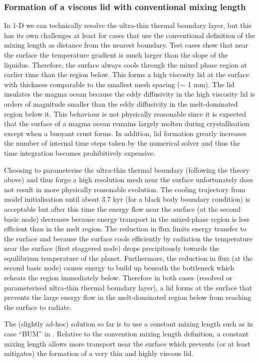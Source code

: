 \subsubsection{Formation of a viscous lid with conventional mixing length}
In 1-D we can technically resolve the ultra-thin thermal boundary layer, but this has its own challenges at least for cases that use the conventional definition of the mixing length as distance from the nearest boundary.  Test cases show that near the surface the temperature gradient is much larger than the slope of the liquidus.  Therefore, the surface always cools through the mixed phase region at earlier time than the region below.  This forms a high viscosity lid at the surface with thickness comparable to the smallest mesh spacing ($\sim$ 1 mm).  The lid insulates the magma ocean because the eddy diffusivity in the high viscosity lid is orders of magnitude smaller than the eddy diffusivity in the melt-dominated region below it.  This behaviour is not physically reasonable since it is expected that the surface of a magma ocean remains largely molten during crystallisation except when a buoyant crust forms.  In addition, lid formation greatly increases the number of internal time steps taken by the numerical solver and thus the time integration becomes prohibitively expensive.

Choosing to parameterise the ultra-thin thermal boundary (following the theory above) and thus forgo a high resolution mesh near the surface unfortunately does not result in more physically reasonable evolution.  The cooling trajectory from model initialisation until about 3.7 kyr (for a black body boundary condition) is acceptable but after this time the energy flow near the surface (at the second basic node) decreases because energy transport in the mixed-phase region is less efficient than in the melt region.  The reduction in flux limits energy transfer to the surface and because the surface cools efficiently by radiation the temperature near the surface (first staggered node) drops precipitously towards the equilibrium temperature of the planet.  Furthermore, the reduction in flux (at the second basic node) causes energy to build up beneath the bottleneck which reheats the region immediately below.  Therefore in both cases (resolved or parameterised ultra-thin thermal boundary layer), a lid forms at the surface that prevents the large energy flow in the melt-dominated region below from reaching the surface to radiate.

The (slightly ad-hoc) solution so far is to use a constant mixing length such as in case ``BUM'' in \cite{BSW18}.  Relative to the convention mixing length definition, a constant mixing length allows more transport near the surface which prevents (or at least mitigates) the formation of a very thin and highly viscous lid.  

